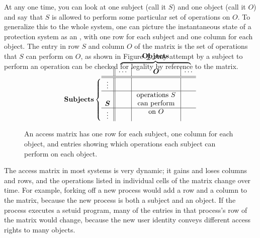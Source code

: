 At any one time, you can look at one subject (call it $S$) and
one object (call it $O$) and say that $S$ is allowed to perform
some particular set of operations on $O$.  To generalize this to the
whole system, one can picture the instantaneous state of a protection
system as an , with one row for each subject and
one column for each object.  The entry in row $S$ and column $O$ of
the matrix is the set of operations that $S$ can perform on $O$, as
shown in Figure~\ref{scan-7-3}.  Any
attempt by a subject to perform an operation can be checked for
legality by reference to the matrix.
\begin{figure}
\vspace{3.7em}
\[\mbox{\textbf{Subjects}}\left\{\vcenter{\vspace{-3.7em}\hbox{$\begin{array}{c||c|p{6em}|c}
\multicolumn{1}{c}{}&
\multicolumn{3}{c}{\overbrace{\hspace{10em}}^{\mbox{\textbf{Objects}}}}\\
 &\cdots&\multicolumn{1}{c|}{\mbox{\boldmath$O$}}&\cdots\\\hline\hline
 \vdots&&&\\\hline
 \lower 1.25em \hbox{\boldmath$S$}&&{\centering operations $S$\\can perform\\on
   $O$\\\vspace{-1.2em}}&\\\hline
 \vdots&&&
 \end{array}$}}\right.\]
\caption{An access matrix has one row for each subject, one column
  for each object, and entries showing which operations each subject can
  perform on each object.}
\label{scan-7-3}
\end{figure}

The access matrix in most systems is very dynamic; it gains and loses
columns and rows, and the operations listed in individual cells of the
matrix change over time.  For example, forking off a new process would
add a row and a column to the matrix, because the new process is both a
subject and an object.  If the process executes a setuid program, many
of the entries in that process's row of the matrix would change,
because the new user identity conveys different access rights to many
objects.

